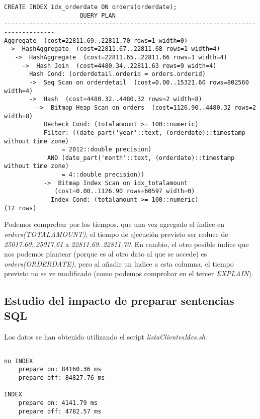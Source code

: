 \documentclass{article}
\begin{document}
\begin{Verbatim}
CREATE INDEX idx_orderdate ON orders(orderdate);
    				 QUERY PLAN                                                                                                                                
------------------------------------------------------------------------------------
Aggregate  (cost=22811.69..22811.70 rows=1 width=0)
 ->  HashAggregate  (cost=22811.67..22811.68 rows=1 width=4)
   ->  HashAggregate  (cost=22811.65..22811.66 rows=1 width=4)
     ->  Hash Join  (cost=4480.34..22811.63 rows=9 width=4)
       Hash Cond: (orderdetail.orderid = orders.orderid)
       ->  Seq Scan on orderdetail  (cost=0.00..15321.60 rows=802560 width=4)
       ->  Hash  (cost=4480.32..4480.32 rows=2 width=8)
         ->  Bitmap Heap Scan on orders  (cost=1126.90..4480.32 rows=2 width=8)
           Recheck Cond: (totalamount >= 100::numeric)
           Filter: ((date_part('year'::text, (orderdate)::timestamp without time zone)
           		= 2012::double precision) 
           	AND (date_part('month'::text, (orderdate)::timestamp without time zone) 
           		= 4::double precision))
           ->  Bitmap Index Scan on idx_totalamount  
              (cost=0.00..1126.90 rows=60597 width=0)
             Index Cond: (totalamount >= 100::numeric)
(12 rows)

\end{Verbatim}

Podemos comprobar por los tiempos, que una vez agregado el índice en \textit{orders(TOTALAMOUNT)}, el tiempo de ejecución previsto ser reduce de \textit{25017.60..25017.61} a \textit{22811.69..22811.70}. En cambio, el otro posible índice que nos podemos plantear (porque es al otro dato al que se accede) es \textit{orders(ORDERDATE)}, pero al añadir un índice a esta columna, el tiempo previsto no se ve modificado (como podemos comprobar en el tercer \textit{EXPLAIN}).



\subsection{Estudio del impacto de preparar sentencias SQL}
Los datos se han obtenido utilizando el script \textit{listaClientesMes.sh}.

\begin{Verbatim}

no INDEX
	prepare on: 84160.36 ms
	prepare off: 84827.76 ms

INDEX
	prepare on: 4141.79 ms
	prepare off: 4782.57 ms

\end{Verbatim}
\end{document}
